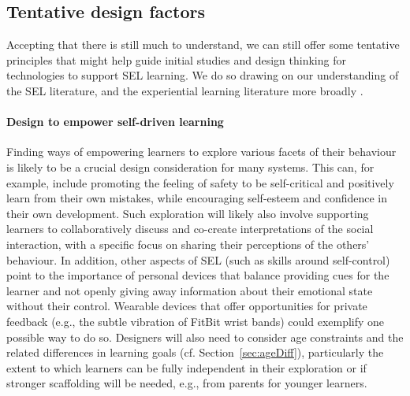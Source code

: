 \documentclass[prodmode,acmtochi]{acmsmall}
\newcommand{\GeraldineFIX}[1]{}
\newcommand{\rephrase}[1]{\textrm{\textrm{\textcolor{gray}{#1}}}}
\begin{document}
\subsection{Tentative design factors}
Accepting that there is still much to understand, we can still offer some tentative principles that might help guide initial studies and design thinking for technologies to support SEL learning.
We do so drawing on our understanding of the SEL literature, and the experiential learning literature more broadly \cite{Moon1999,Kolb2001,Griffith2000,Fleck2010}. 

\paragraph{Design to empower self-driven learning} Finding ways of empowering learners to explore various facets of their behaviour is likely to be a crucial design consideration for many systems. This can, for example, include promoting the feeling of safety to be self-critical and positively learn from their own mistakes, while encouraging self-esteem and confidence in their own development. Such exploration will likely also involve supporting learners to collaboratively discuss and co-create interpretations of the social interaction, with a specific focus on sharing their perceptions of the others' behaviour. In addition, other aspects of SEL (such as skills around self-control) point to the importance of personal devices that balance providing cues for the learner and not openly giving away information about their emotional state without their control. Wearable devices that offer opportunities for private feedback (e.g., the subtle vibration of FitBit wrist bands) could exemplify one possible way to do so. Designers will also need to consider age constraints and the related differences in learning goals
(cf. Section~\ref{sec:ageDiff}), particularly the extent to which learners can be fully independent in their exploration or if stronger scaffolding will be needed, e.g., from parents for younger learners. 

\GeraldineFIX{ PETR-- choose not to do this as of now, given that the paper is very long already, and to provide a more systematic unpacking would be at least another half page? Or did you think this can be done faster? GF NOTE: A possibility here to provide a more systematic unpacking eg of self-driven learning: supporting different roles eg learner, peer, mentor etc; different locations ef class, home, everyday... ???}
\end{document}
